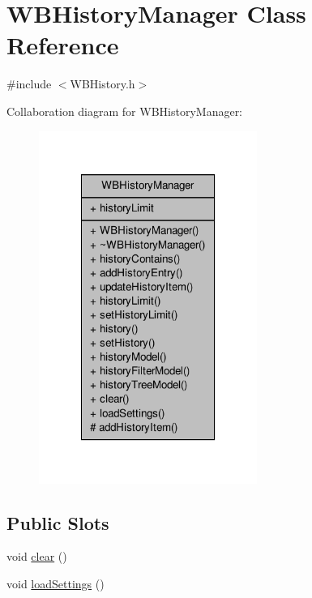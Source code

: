 \hypertarget{class_w_b_history_manager}{\section{W\-B\-History\-Manager Class Reference}
\label{dd/d34/class_w_b_history_manager}
}


{\ttfamily \#include $<$W\-B\-History.\-h$>$}



Collaboration diagram for W\-B\-History\-Manager\-:
\nopagebreak
\begin{figure}[H]
\begin{center}
\leavevmode
\includegraphics[width=202pt]{df/df7/class_w_b_history_manager__coll__graph}
\end{center}
\end{figure}
\subsection*{Public Slots}
\begin{DoxyCompactItemize}
\item 
void \hyperlink{class_w_b_history_manager_a8aeebe09c94695b3e139ca534234e3a9}{clear} ()
\item 
void \hyperlink{class_w_b_history_manager_a28ae9f1cea36d3351846d33378cf1d42}{load\-Settings} ()
\end{DoxyCompactItemize}
